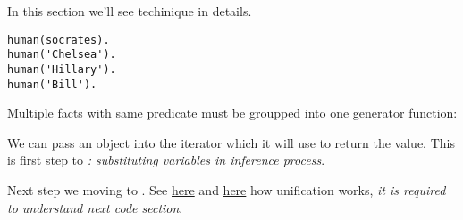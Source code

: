 \label{yield}

In this section we'll see \href{http://yieldprolog.sourceforge.net/}{\yp}
techinique in details.

\begin{verbatim}
human(socrates).
human('Chelsea').
human('Hillary').
human('Bill').
\end{verbatim}

Multiple facts with same predicate must be groupped into one generator function: 



We can pass an object into the iterator which it will use to return the value.
This is first step to \emph{: substituting variables in
inference process}.


Next step we moving to . See
\href{http://www.amzi.com/articles/prolog_under_the_hood.htm}{here} and \href{http://www.learnprolognow.org/lpnpage.php?pagetype=html&pageid=lpn-htmlse5}{here} how
unification works, \emph{it is required to understand next code section}.


